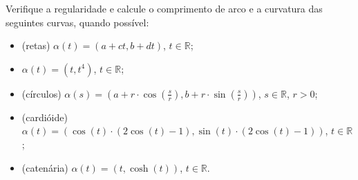 \documentclass[../main.tex]{subfiles}
\begin{document}
\begin{exercicio}{7}
	Verifique a regularidade e calcule o comprimento de arco e a curvatura
	das seguintes curvas, quando possível:
	
	\begin{itemize}
		\item (retas) $\alpha(t)=(a + ct, b + dt)$, $t\in \mathbb{R}$;
		\item $\alpha(t)=(t, t^4)$, $t\in \mathbb{R}$;
		\item (círculos) $\alpha(s)=(a + r\cdot \cos(\frac{s}{r}), b+r\cdot \sin(\frac{s}{r}))$, $s\in \mathbb{R}$, $r>0$;
		\item (cardióide) $\alpha(t)=(\cos(t)\cdot (2\cos(t) - 1), \sin(t)\cdot (2\cos(t) -1))$, $t\in \mathbb{R}$;
		\item (catenária) $\alpha(t)=(t, \cosh(t))$, $t\in \mathbb{R}$.
	\end{itemize}
\end{exercicio}
\end{document}
